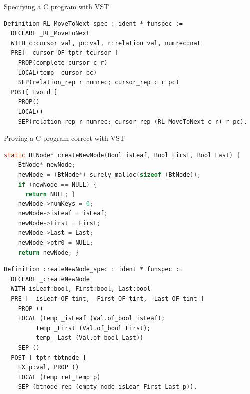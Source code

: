 \documentclass[page number,usenames,dvipsnames]{beamer}
\def\spec#1{{\color{spec}\textbf{#1}}}
\def\prog#1{{\color{prog}\textbf{#1}}}
\begin{document}
\begin{frame}[fragile]{Specifying a C program with VST}
 \begin{lstlisting}[language=Coq,basicstyle=\small]
Definition RL_MoveToNext_spec : ident * funspec :=
  DECLARE _RL_MoveToNext
  WITH c:cursor val, pc:val, r:relation val, numrec:nat
  PRE[ _cursor OF tptr tcursor ]
    PROP(complete_cursor c r)
    LOCAL(temp _cursor pc)
    SEP(relation_rep r numrec; cursor_rep c r pc)
  POST[ tvoid ]
    PROP()
    LOCAL()
    SEP(relation_rep r numrec; cursor_rep (RL_MoveToNext c r) r pc).
 \end{lstlisting}
 \vfill
 \begin{center}
 \end{center}
\end{frame}




\begin{frame}[fragile]{Proving a C program correct with VST}
  \begin{lstlisting}[language=C, basicstyle=\scriptsize]
static BtNode* createNewNode(Bool isLeaf, Bool First, Bool Last) {
    BtNode* newNode;
    newNode = (BtNode*) surely_malloc(sizeof (BtNode));
    if (newNode == NULL) {
      return NULL; }
    newNode->numKeys = 0;
    newNode->isLeaf = isLeaf;
    newNode->First = First;
    newNode->Last = Last;
    newNode->ptr0 = NULL;
    return newNode; }
  \end{lstlisting}
  \begin{lstlisting}[language=Coq, basicstyle=\tiny]
Definition createNewNode_spec : ident * funspec :=
  DECLARE _createNewNode
  WITH isLeaf:bool, First:bool, Last:bool
  PRE [ _isLeaf OF tint, _First OF tint, _Last OF tint ]
    PROP ()
    LOCAL (temp _isLeaf (Val.of_bool isLeaf);
         temp _First (Val.of_bool First);
         temp _Last (Val.of_bool Last))
    SEP ()
  POST [ tptr tbtnode ]
    EX p:val, PROP ()
    LOCAL (temp ret_temp p)
    SEP (btnode_rep (empty_node isLeaf First Last p)).
  \end{lstlisting}

\end{frame}
\end{document}
